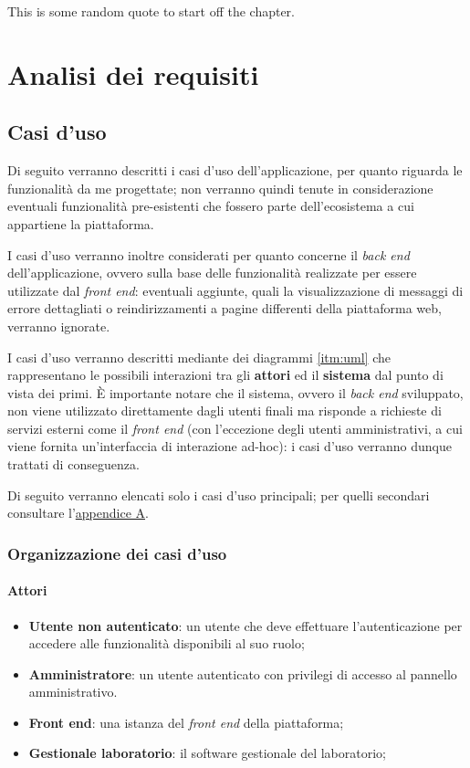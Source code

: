 


\begin{savequote}[75mm]
This is some random quote to start off the chapter.
\end{savequote}
\chapter{Analisi dei requisiti}
\label{chap3}
\section{Casi d'uso}
\label{sec:usecase}
Di seguito verranno descritti i casi d'uso dell'applicazione, per quanto riguarda le funzionalità da me progettate; non verranno quindi tenute in considerazione eventuali funzionalità pre-esistenti che fossero parte dell'ecosistema a cui appartiene la piattaforma.

I casi d'uso verranno inoltre considerati per quanto concerne il \textit{back end} dell'applicazione, ovvero sulla base delle funzionalità realizzate per essere utilizzate dal \textit{front end}: eventuali aggiunte, quali la visualizzazione di messaggi di errore dettagliati o reindirizzamenti a pagine differenti della piattaforma web, verranno ignorate.

I casi d'uso verranno descritti mediante dei diagrammi \ref{itm:uml} che rappresentano le possibili interazioni tra gli \textbf{attori} ed il \textbf{sistema} dal punto di vista dei primi. È importante notare che il sistema, ovvero il \textit{back end} sviluppato, non viene utilizzato direttamente dagli utenti finali ma risponde a richieste di servizi esterni come il \textit{front end} (con l'eccezione degli utenti amministrativi, a cui viene fornita un'interfaccia di interazione ad-hoc): i casi d'uso verranno dunque trattati di conseguenza.

Di seguito verranno elencati solo i casi d'uso principali; per quelli secondari consultare l'\hyperref[sec:AppendixA]{appendice A}.
\subsection{Organizzazione dei casi d'uso}
\subsubsection{Attori}
\begin{itemize}
    \item \textbf{Utente non autenticato}: un utente che deve effettuare l'autenticazione per accedere alle funzionalità disponibili al suo ruolo;
    \item \textbf{Amministratore}: un utente autenticato con privilegi di accesso al pannello amministrativo.
    \item \textbf{Front end}: una istanza del \textit{front end} della piattaforma;
    \item \textbf{Gestionale laboratorio}: il software gestionale del laboratorio;
\end{itemize}
\vspace{-12pt}
